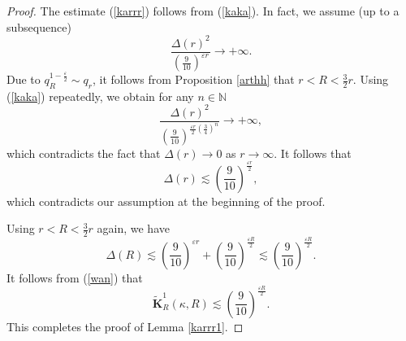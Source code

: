 \documentclass[10pt,a4paper]{amsart}
\begin{document}
\begin{proof}
The estimate (\ref{karrr}) follows from (\ref{kaka}). In fact, we assume (up to a subsequence)
\[\frac{\Delta(r)^2}{(\frac{9}{10})^{\varepsilon r}}\to +\infty.\]
Due to $q_R^{1-\frac{\varepsilon}{2}}\sim q_r$, it follows from Proposition \ref{arthh} that $r<R<\frac{3}{2}r$. Using (\ref{kaka}) repeatedly, we obtain for any $n\in \mathbb{N}$
\[\frac{\Delta(r)^2}{(\frac{9}{10})^{\frac{\varepsilon r}{2}(\frac{3}{4})^n}}\to +\infty,\]
which contradicts the fact that $\Delta(r)\to 0$ as $r\to \infty$. It follows that
\[\Delta(r)\lesssim (\frac{9}{10})^{\frac{\varepsilon r}{2}},\]
which contradicts our assumption at the beginning of the proof.

Using $r<R<\frac{3}{2}r$ again,  we have
\[\Delta(R)\lesssim (\frac{9}{10})^{\varepsilon r}+(\frac{9}{10})^{\frac{\varepsilon R}{2}}\lesssim (\frac{9}{10})^{\frac{\varepsilon R}{2}}.\]
{It follows from (\ref{wan}) that}
\[\widetilde{\mathbf{K}}_R^1(\kappa,R)\lesssim (\frac{9}{10})^{\frac{\varepsilon R}{2}}.\]
This completes the proof of Lemma \ref{karrr1}.
\end{proof}
\end{document}
